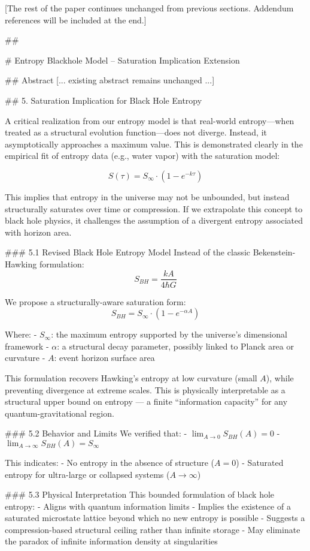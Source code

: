 [The rest of the paper continues unchanged from previous sections. Addendum references will be included at the end.]

##

# Entropy Blackhole Model – Saturation Implication Extension

## Abstract
[... existing abstract remains unchanged ...]

## 5. Saturation Implication for Black Hole Entropy

A critical realization from our entropy model is that real-world entropy—when treated as a structural evolution function—does not diverge. Instead, it asymptotically approaches a maximum value. This is demonstrated clearly in the empirical fit of entropy data (e.g., water vapor) with the saturation model:

\[
S(\tau) = S_{\infty} \cdot \left(1 - e^{-k \tau} \right)
\]

This implies that entropy in the universe may not be unbounded, but instead structurally saturates over time or compression. If we extrapolate this concept to black hole physics, it challenges the assumption of a divergent entropy associated with horizon area.

### 5.1 Revised Black Hole Entropy Model
Instead of the classic Bekenstein-Hawking formulation:
\[
S_{BH} = \frac{k A}{4 \hbar G}
\]

We propose a structurally-aware saturation form:
\[
S_{BH} = S_{\infty} \cdot \left(1 - e^{-\alpha A} \right)
\]

Where:
- \( S_{\infty} \): the maximum entropy supported by the universe’s dimensional framework
- \( \alpha \): a structural decay parameter, possibly linked to Planck area or curvature
- \( A \): event horizon surface area

This formulation recovers Hawking’s entropy at low curvature (small \( A \)), while preventing divergence at extreme scales. This is physically interpretable as a structural upper bound on entropy — a finite “information capacity” for any quantum-gravitational region.

### 5.2 Behavior and Limits
We verified that:
- \( \lim_{A \to 0} S_{BH}(A) = 0 \)
- \( \lim_{A \to \infty} S_{BH}(A) = S_{\infty} \)

This indicates:
- No entropy in the absence of structure (\( A = 0 \))
- Saturated entropy for ultra-large or collapsed systems (\( A \to \infty \))

### 5.3 Physical Interpretation
This bounded formulation of black hole entropy:
- Aligns with quantum information limits
- Implies the existence of a saturated microstate lattice beyond which no new entropy is possible
- Suggests a compression-based structural ceiling rather than infinite storage
- May eliminate the paradox of infinite information density at singularities

